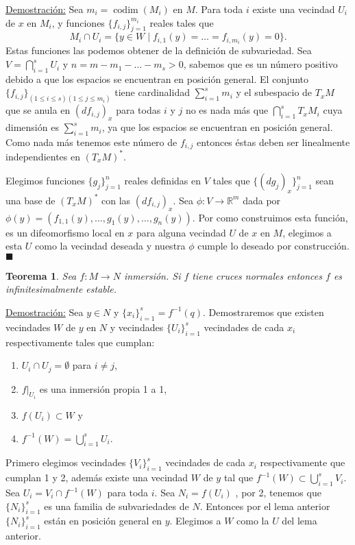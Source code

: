 \documentclass{report}
\newtheorem{theorem}{Teorema}[section]
\theoremstyle{definition}
\DeclareMathOperator{\cod}{codim}
\begin{document}
\underline{Demostraci\'on:} Sea $m_i = \cod(M_i)$ en $M$. Para toda $i$ existe una vecindad $U_i$ de $x$ en $M_i$, y funciones $\{ f_{i , j} \}_{j=1}^{m_i}$ reales tales que
$$M_i \cap U_i = \{ y \in W \mid f_{i,1} (y) = \dots = f_{i , m_i} (y) = 0 \} .$$
Estas funciones las podemos obtener de la definici\'on de subvariedad. Sea $V = \bigcap\limits_{i=1}^s U_i$ y $n = m - m_1 - \dots - m_s>0$, sabemos que es un n\'umero positivo debido a que los espacios se encuentran en posici\'on general. El conjunto $\{ f_{i,j} \}_{(1 \leq i \leq s)(1 \leq j \leq m_i)}$ tiene cardinalidad $\sum\limits_{i=1}^s m_i$ y el subespacio de $T_x M$ que se anula en $(df_{i,j})_x$ para todas $i$ y $j$ no es nada m\'as que $\bigcap\limits_{i=1}^s T_x M_i$ cuya dimensi\'on es $\sum\limits_{i=1}^s m_i$, ya que los espacios se encuentran en posici\'on general. Como nada m\'as tenemos este n\'umero de $f_{i,j}$ entonces \'estas deben ser linealmente independientes en $(T_x M)^\ast$.

Elegimos funciones $\{g_j \}_{j=1}^n$ reales definidas en $V$ tales que $ \{ (dg_j)_x \}_{j=1}^n$ sean una base de $(T_x M)^\ast$ con las $(df_{i,j})_x$. Sea $\phi: V \to \mathbb{R}^m$ dada por $\phi(y) = (f_{1 , 1} (y) , \dots , g_1 (y) , \dots , g_n (y))$. Por como construimos esta funci\'on, es un difeomorfismo local en $x$ para alguna vecindad $U$ de $x$ en $M$, elegimos a esta $U$ como la vecindad deseada y nuestra $\phi$ cumple lo deseado por construcci\'on. $\blacksquare$

\begin{theorem}
Sea $f:M \to N$ inmersi\'on. Si $f$ tiene cruces normales entonces $f$ es infinitesimalmente estable.
\end{theorem}

\underline{Demostraci\'on:} Sea $ y \in N$ y $\{x_i \}_{i=1}^s = f^{-1} (q)$. Demostraremos que existen vecindades $W$ de $y$ en $N$ y vecindades $\{U_i \}_{i=1}^s$ vecindades de cada $x_i$ respectivamente tales que cumplan:
\begin{enumerate}
\item $U_i \cap U_j = \emptyset$ para $i \neq j$,
\item $f \vert_{U_i}$ es una inmersi\'on propia 1 a 1,
\item $f(U_i) \subset W$ y
\item $f^{-1} (W) = \bigcup\limits_{i=1}^s U_i$.
\end{enumerate}

Primero elegimos vecindades $ \{V_i \}_{i=1}^s$ vecindades de cada $x_i$ respectivamente que cumplan 1 y 2, adem\'as existe una vecindad $W$ de $y$ tal que $f^{-1} (W) \subset \bigcup\limits_{i=1}^s V_i$. Sea $U_i = V_i \cap f^{-1} (W)$ para toda $i$. Sea $N_i = f(U_i)$ , por 2, tenemos que $\{N_i \}_{i=1}^s$ es una familia de subvariedades de $N$. Entonces por el lema anterior $\{N_i \}_{i=1}^s$ est\'an en posici\'on general en $y$. Elegimos a $W$ como la $U$ del lema anterior.
\end{document}
